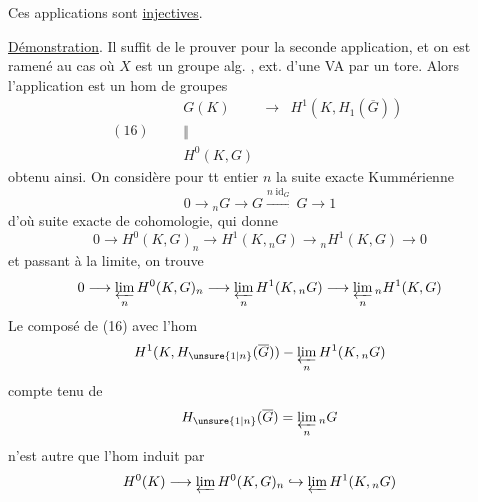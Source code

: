 Ces applications sont \uline{injectives}.

\uline{Démonstration}. Il suffit de le prouver pour la seconde application, et on est ramené au cas où $X$ est  un groupe alg. , ext. d'une VA par un tore. Alors l'application est un hom de groupes
\[
(16)\qquad
\begin{array}{ccl}
G(K)&\longrightarrow&H^1(K,H_1(\overline G))\\[-.5ex]
\Vert&&\\[-.5ex]
H^0(K,G)&&
\end{array}
\]
obtenu ainsi. On considère pour tt entier $n$ la suite exacte Kummérienne
\[
0\longrightarrow {}_nG\longrightarrow G\xrightarrow{n\operatorname{id}_G}G\longrightarrow1
\]
d'où suite exacte de cohomologie, qui donne
\[
0\longrightarrow H^0(K,G)_n\longrightarrow H^1(K,{}_nG)\longrightarrow {}_nH^1(K,G)\longrightarrow0
\]
et passant à la limite, on trouve
\[
0\longrightarrow\varprojlim_n H^0(K,G)_n\longrightarrow\varprojlim_n H^1(K,{}_nG)\longrightarrow\varprojlim_n {}_nH^1(K,G)
\]
Le composé de (16) avec l'hom  
\[
H^1(K,H_{\unsure{1|n}}(\overline G))-\varprojlim_n H^1(K,{}_nG)
\]
compte tenu de
\[
H_{\unsure{1|n}}(\overline G)=\varprojlim_n {}_nG
\]
n'est autre que l'hom induit par
\[
H^0(K)\longrightarrow\varprojlim H^0(K,G)_n\hookrightarrow\varprojlim H^1(K,{}_nG)
\]
